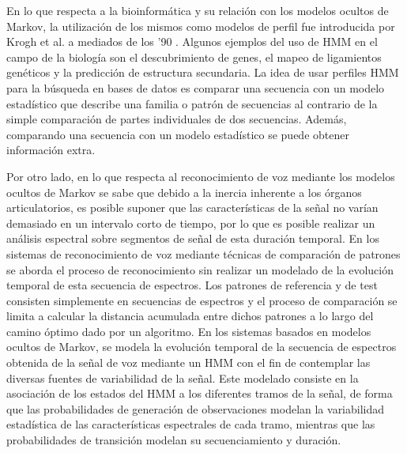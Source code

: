                                                                                                                                                                                                                                                                                                                                                        En lo que respecta a la bioinformática y su relación con los modelos ocultos de Markov, la utilización de los mismos como modelos de perfil fue introducida por Krogh et al. a mediados de los ’90 \cite{eddy1998profile}                                                                                                                                                                                                                                                                                                           . Algunos ejemplos del uso de HMM en el campo de la biología son el descubrimiento de genes, el mapeo de ligamientos genéticos y la predicción de estructura secundaria.
La idea de usar perfiles HMM para la búsqueda en bases de datos es comparar una secuencia con un modelo estadístico que describe una familia o patrón de secuencias al contrario de la simple comparación de partes individuales de dos secuencias. Además, comparando una secuencia con un modelo estadístico se puede obtener información extra.

Por otro lado, en lo que respecta al reconocimiento de voz mediante los modelos ocultos de Markov se sabe que debido a la inercia inherente a los órganos articulatorios, es posible suponer que las características de la señal no varían demasiado en un intervalo corto de tiempo, por lo que es posible realizar un análisis espectral sobre segmentos de señal de esta duración temporal. En los sistemas de reconocimiento de voz mediante técnicas de comparación de patrones se aborda el proceso de reconocimiento sin realizar un modelado de la evolución temporal de esta secuencia de espectros. Los patrones de referencia y de test consisten simplemente en secuencias de espectros y el proceso de comparación se limita a calcular la distancia acumulada entre dichos patrones a lo largo del camino óptimo dado por un algoritmo. En los sistemas basados en modelos ocultos de Markov, se modela la evolución temporal de la secuencia de espectros obtenida de la señal de voz mediante un HMM con el fin de contemplar las diversas fuentes de variabilidad de la señal. Este modelado consiste en la asociación de los estados del HMM a los diferentes tramos de la señal, de forma que las probabilidades de generación de observaciones modelan la variabilidad estadística de las características espectrales de cada tramo, mientras que las probabilidades de transición modelan su secuenciamiento y duración.


